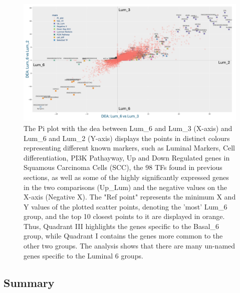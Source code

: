 \begin{figure}[H]    
    \centering
    \includegraphics[width=1.0\textwidth,height=1.0\textheight,keepaspectratio]{Sections/Network_II/resources/reward/PI_Lum_6.png}
    \caption{The Pi plot with the \acrfull{dea} between Lum\_6 and Lum\_3 (X-axis) and Lum\_6 and Lum\_2 (Y-axis) displays the points in distinct colours representing different known markers, such as Luminal Markers, Cell differentiation, PI3K Pathayway, Up and Down Regulated genes in Squamous Carcinoma Cells (SCC), the 98 TFs found in previous sections, as well as some of the highly significantly expressed genes in the two comparisons (Up\_Lum) and the negative values on the X-axis (Negative X). The "Ref point" represents the minimum X and Y values of the plotted scatter points, denoting the 'most' Lum\_6 group, and the top 10 closest points to it are displayed in orange. Thus, Quadrant III highlights the genes specific to the Basal\_6 group, while Quadrant I contains the genes more common to the other two groups. The analysis shows that there are many un-named genes specific to the Luminal 6 groups.}
    \label{fig:N_II:pi_lum_6}
\end{figure}


\subsection{Summary}


